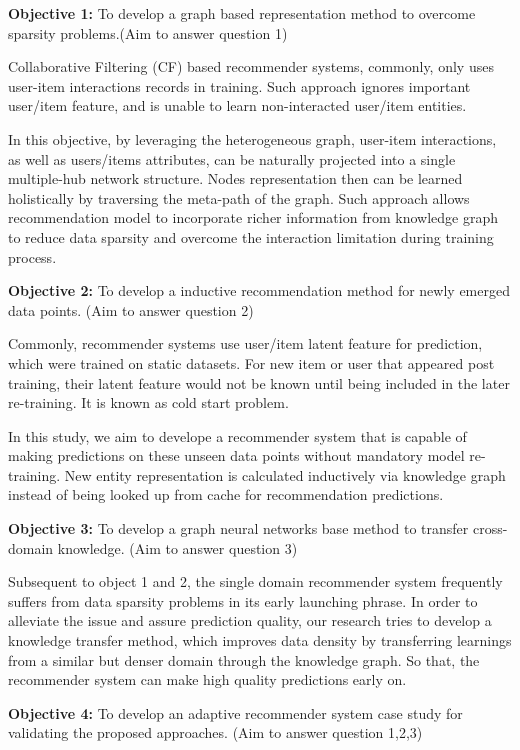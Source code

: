\bigskip
\textbf{Objective 1:} To develop a graph based representation method to overcome sparsity problems.(Aim to answer question 1)

Collaborative Filtering (CF) based recommender systems, commonly, only uses user-item interactions records in training. Such approach ignores important user/item feature, and is unable to learn non-interacted user/item entities. 

In this objective, by leveraging the heterogeneous graph, user-item interactions, as well as users/items attributes, can be naturally projected into a single multiple-hub network \citep{Shi2017} structure. Nodes representation then can be learned holistically by traversing the meta-path of the graph. Such approach allows recommendation model to incorporate richer information from knowledge graph to reduce data sparsity and overcome the interaction limitation during training process.


\bigskip
\textbf{Objective 2:} To develop a inductive recommendation method for newly emerged data points. (Aim to answer question 2)

Commonly, recommender systems use user/item latent feature for prediction, which were trained on static datasets. For new item or user that appeared post training, their latent feature would not be known until being included in the later re-training. It is known as cold start problem.

In this study, we aim to develope a recommender system that is capable of making predictions on these unseen data points without mandatory model re-training. New entity representation is calculated inductively via knowledge graph instead of being looked up from cache for recommendation predictions.


\bigskip
\textbf{Objective 3:} To develop a graph neural networks base method to transfer cross-domain knowledge. (Aim to answer question 3)

Subsequent to object 1 and 2, the single domain recommender system frequently suffers from data sparsity problems in its early launching phrase. In order to alleviate the issue and assure prediction quality, our research tries to develop a knowledge transfer method, which improves data density by transferring learnings from a similar but denser domain through the knowledge graph. So that, the recommender system can make high quality predictions early on.

\bigskip
\textbf{Objective 4:} To develop an adaptive recommender system case study for validating the proposed approaches. (Aim to answer question 1,2,3)

